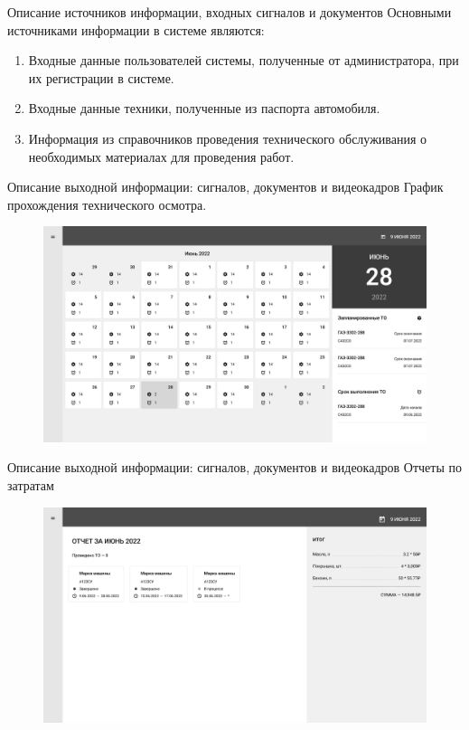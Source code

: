 \documentclass{beamer}
\begin{document}
\begin{frame}
	{Описание источников информации, входных сигналов и документов}
    Основными источниками информации в системе являются:
    \begin{enumerate}
        \item Входные данные пользователей системы, полученные от администратора,
            при их регистрации в системе.
        \item Входные данные техники, полученные из паспорта автомобиля.
        \item Информация из справочников проведения технического обслуживания о
            необходимых материалах для проведения работ.
    \end{enumerate}
\end{frame}

\begin{frame}
	{Описание выходной информации: сигналов, документов и видеокадров}
    График прохождения технического осмотра.
    \begin{figure}[H]
        \centering
        \includegraphics[keepaspectratio,width=\textwidth]{3/images/calendar-planning.png}
    \end{figure}
\end{frame}
\begin{frame}
	{Описание выходной информации: сигналов, документов и видеокадров}
    Отчеты по затратам
    \begin{figure}[H]
        \centering
        \includegraphics[keepaspectratio,width=\textwidth]{3/images/expenses-report.png}
    \end{figure}
\end{frame}
\end{document}
